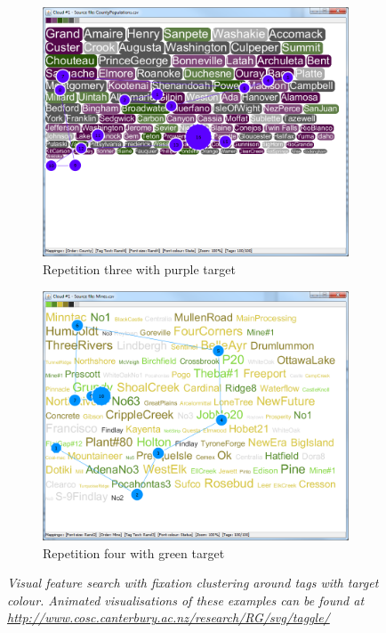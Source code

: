 \begin{figure}[!htb]
\begin{subfigure}{.5\textwidth}
  \centering
  \includegraphics[scale=0.25]{featuresearchgazetrial3.png}
  \caption{Repetition three with purple target}
\end{subfigure}%
\begin{subfigure}{.5\textwidth}
  \centering
  \includegraphics[scale=0.25]{featuresearchgazetrial4.png}
  \caption{Repetition four with green target}
\end{subfigure}
\caption{\textit{Visual feature search with fixation clustering around tags with target colour. Animated visualisations of these examples can be found at \url{http://www.cosc.canterbury.ac.nz/research/RG/svg/taggle/}}}
\label{fig:visualfeaturesearch}
\end{figure}

